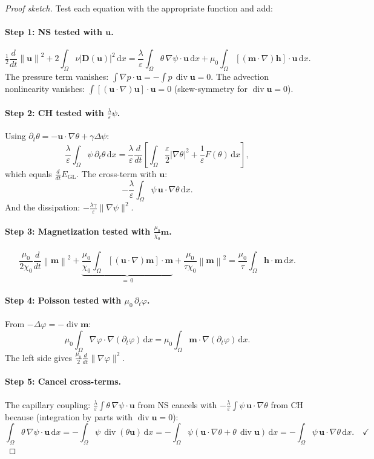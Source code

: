 \documentclass[11pt,a4paper]{article}
\theoremstyle{definition}
\theoremstyle{remark}
\newcommand{\dd}{\,\mathrm{d}}
\newcommand{\dt}{\partial_t}
\newcommand{\dv}{\operatorname{div}}
\newcommand{\grad}{\nabla}
\newcommand{\eps}{\varepsilon}
\newcommand{\half}{\tfrac{1}{2}}
\newcommand{\norm}[1]{\left\| #1 \right\|}
\newcommand{\bfu}{\bm{u}}
\newcommand{\bfm}{\bm{m}}
\newcommand{\bfh}{\bm{h}}
\begin{document}
\begin{proof}[Proof sketch]
Test each equation with the appropriate function and add:

\paragraph{Step 1: NS tested with $\bfu$.}
\[
  \half\frac{d}{dt}\norm{\bfu}^2
  + 2\int_\Omega \nu|\bm{D}(\bfu)|^2 \dd x
  = \frac{\lambda}{\eps}\int_\Omega \theta\,\grad\psi \cdot \bfu \dd x
    + \mu_0 \int_\Omega [(\bfm \cdot \grad)\bfh] \cdot \bfu \dd x.
\]
The pressure term vanishes: $\int \grad p \cdot \bfu = -\int p\,\dv\bfu = 0$.
The advection nonlinearity vanishes:
$\int [(\bfu\cdot\grad)\bfu]\cdot\bfu = 0$ (skew-symmetry for $\dv\bfu=0$).

\paragraph{Step 2: CH tested with $\frac{\lambda}{\eps}\psi$.}
Using $\dt\theta = -\bfu\cdot\grad\theta + \gamma\Delta\psi$:
\[
  \frac{\lambda}{\eps}\int_\Omega \psi\,\dt\theta \dd x
  = \frac{\lambda}{\eps}\frac{d}{dt}\left[
    \int_\Omega \frac{\eps}{2}|\grad\theta|^2 + \frac{1}{\eps}F(\theta) \dd x
  \right],
\]
which equals $\frac{d}{dt}E_{\mathrm{GL}}$. The cross-term with $\bfu$:
\[
  -\frac{\lambda}{\eps}\int_\Omega \psi\,\bfu\cdot\grad\theta \dd x.
\]
And the dissipation: $-\frac{\lambda\gamma}{\eps}\|\grad\psi\|^2$.

\paragraph{Step 3: Magnetization tested with $\frac{\mu_0}{\chi_0}\bfm$.}
\[
  \frac{\mu_0}{2\chi_0}\frac{d}{dt}\norm{\bfm}^2
  + \underbrace{\frac{\mu_0}{\chi_0}\int_\Omega [(\bfu\cdot\grad)\bfm]\cdot\bfm}_{=\,0}
  + \frac{\mu_0}{\tau\chi_0}\norm{\bfm}^2
  = \frac{\mu_0}{\tau}\int_\Omega \bfh \cdot \bfm \dd x.
\]

\paragraph{Step 4: Poisson tested with $\mu_0\,\dt\varphi$.}
From $-\Delta\varphi = -\dv\bfm$:
\[
  \mu_0\int_\Omega \grad\varphi \cdot \grad(\dt\varphi) \dd x
  = \mu_0\int_\Omega \bfm \cdot \grad(\dt\varphi) \dd x.
\]
The left side gives $\frac{\mu_0}{2}\frac{d}{dt}\|\grad\varphi\|^2$.

\paragraph{Step 5: Cancel cross-terms.}
The capillary coupling: $\frac{\lambda}{\eps}\int\theta\,\grad\psi\cdot\bfu$
from NS cancels with $-\frac{\lambda}{\eps}\int\psi\,\bfu\cdot\grad\theta$ from CH
because (integration by parts with $\dv\bfu = 0$):
\[
  \int_\Omega \theta\,\grad\psi\cdot\bfu \dd x
  = -\int_\Omega \psi\,\dv(\theta\bfu) \dd x
  = -\int_\Omega \psi\left(\bfu\cdot\grad\theta + \theta\,\dv\bfu\right) \dd x
  = -\int_\Omega \psi\,\bfu\cdot\grad\theta \dd x. \quad \checkmark
\]


\end{proof}
\end{document}
